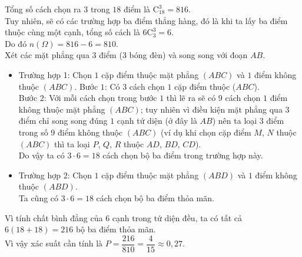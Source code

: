 \begin{ex}
{\begin{center}
		\end{center}
		Tổng số cách chọn ra $3$ trong $18$ điểm là $\mathrm{C}_{18}^3=816$.\\
		Tuy nhiên, sẽ có các trường hợp ba điểm thẳng hàng, đó là khi ta lấy ba điểm thuộc cùng một cạnh, tổng số cách là $6\mathrm{C}_3^3=6$.\\
		Do đó $n(\Omega)=816-6=810$.\\
		Xét các mặt phẳng qua $3$ điểm ($3$ bóng đèn) và song song với đoạn $AB$.
		\begin{itemize}
			\item Trường hợp 1: Chọn $1$ cặp điểm thuộc mặt phẳng $(ABC)$ và $1$ điểm không thuộc $(ABC)$.
			Bước $1$: Có $3$ cách chọn $1$ cặp điểm thuộc ($ABC$).\\
			Bước $2$: Với mỗi cách chọn trong bước $1$ thì lẽ ra sẽ có $9$ cách chọn $1$ điểm không thuộc mặt phẳng $(ABC)$; tuy nhiên vì điều kiện mặt phẳng qua $3$ điểm chỉ song song đúng $1$ cạnh tứ diện (ở đây là $AB$)
			nên ta loại $3$ điểm trong số $9$ điểm không thuộc $(ABC)$ (ví dụ khi chọn cặp điểm $M$, $N$ thuộc $(ABC)$ thì ta loại $P$, $Q$, $R$ thuộc $AD$, $BD$, $CD$).\\
			Do vậy ta có $3\cdot 6=18$ cách chọn bộ ba điểm trong trường hợp này.
			\item Trường hợp 2: Chọn $1$ cặp điểm thuộc mặt phẳng $(ABD)$ và $1$ điểm không thuộc $(ABD)$.\\
			Ta cũng có $3\cdot 6=18$ cách chọn bộ ba điểm thỏa mãn.
		\end{itemize}		
		Vì tính chất bình đẳng của $6$ cạnh trong tứ diện đều, ta có tất cả $6(18+18)=216$ bộ ba điểm thỏa mãn.\\
		Vì vậy xác suất cần tính là $P=\dfrac{216}{810}=\dfrac{4}{15}\approx 0,27$.
	}
\end{ex}

